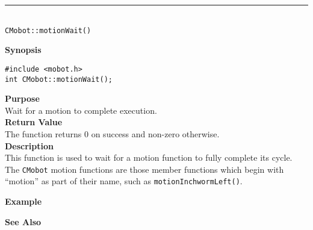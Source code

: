 \noindent
\vspace{5pt}
\rule{4.5in}{0.015in}\\
\noindent
{\LARGE \texttt{CMobot::motionWait()}}\\
{}

\noindent
{\bf Synopsis}
\vspace{-8pt}
\begin{verbatim}
#include <mobot.h>
int CMobot::motionWait();
\end{verbatim}

\noindent
{\bf Purpose}\\
Wait for a motion to complete execution.\\

\noindent
{\bf Return Value}\\
The function returns 0 on success and non-zero otherwise.\\

\noindent
{\bf Description}\\
This function is used to wait for a motion function to fully complete its cycle.
The \texttt{CMobot} motion functions are those member functions which begin
with ``motion'' as part of their name, such as \texttt{motionInchwormLeft()}.


\noindent
{\bf Example}\\
\noindent

\noindent
{\bf See Also}\\

